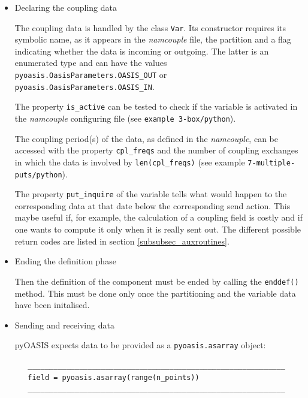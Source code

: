 \begin{itemize}
To initialise  a grid and write the grid longitudes and latitudes, one
has to create an instance of the {\tt Grid} class. Then to write the grid cell corner longitudes and latitudes, areas, mask, cell valid fraction, angle, the
{\tt set\_corners}, {\tt set\_area},  {\tt set\_mask},  {\tt set\_frac}, and {\tt set\_angle} methods can be used respectively.

\item{Declaring the coupling data}
\label{{index:declaring-the-coupling-data}}

The coupling data is handled by the class {\tt Var}. Its constructor requires
its symbolic name, as it appears in the {\it namcouple} file, the partition and a flag indicating whether the
data is incoming or outgoing. The latter is an enumerated type and can
have the values {\tt pyoasis.OasisParameters.OASIS\_OUT} or
{\tt pyoasis.OasisParameters.OASIS\_IN}.

The property {\tt is\_active} can be tested to check if the variable is
activated in the {\it namcouple} configuring file (see {\tt example 3-box/python}).

The coupling period(s) of the data, as defined in the {\it namcouple}, can be
accessed with the property {\tt cpl\_freqs} and the number of coupling exchanges in
which the data is involved by {\tt len(cpl\_freqs)} (see example {\tt 7-multiple-puts/python}).

The property {\tt put\_inquire} of the variable tells what would happen to the corresponding data at that date
below the corresponding send action. This maybe useful if, for
example, the calculation of a coupling field is costly and if one
wants to compute it only when it is really sent out. The
different possible return codes are listed in section \ref{subsubsec_auxroutines}.

\item{Ending the definition phase}
\label{{index:ending-the-definition-phase}}

Then the definition of the component must be ended by calling the {\tt enddef()}
method. This must be done only once the partitioning and the variable data have been initalised.

\item{Sending and receiving data}
\label{{index:sending-and-receiving-data}}

pyOASIS expects data to be provided as a {\tt pyoasis.asarray} object:

\begin{verbatim}
   ____________________________________________________________
   field = pyoasis.asarray(range(n_points))
   ____________________________________________________________
\end{verbatim}


\end{itemize}

